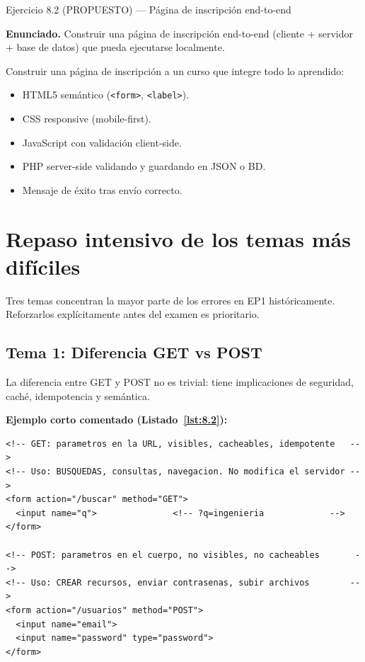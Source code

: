 \documentclass[11pt,a4paper,openany]{book}
\begin{document}
\begin{cajaejercicio}{Ejercicio 8.2 (PROPUESTO) --- Página de inscripción end-to-end}


\textbf{Enunciado.} Construir una página de inscripción end-to-end (cliente + servidor + base de datos) que pueda ejecutarse localmente.

Construir una página de inscripción a un curso que integre todo lo
aprendido:
\begin{itemize}
\item HTML5 semántico (\texttt{<form>}, \texttt{<label>}).
\item CSS responsive (mobile-first).
\item JavaScript con validación client-side.
\item PHP server-side validando y guardando en JSON o BD.
\item Mensaje de éxito tras envío correcto.
\end{itemize}
\end{cajaejercicio}

\section{Repaso intensivo de los temas más difíciles}

Tres temas concentran la mayor parte de los errores en EP1
históricamente. Reforzarlos explícitamente antes del examen es
prioritario.


\subsection{Tema 1: Diferencia GET vs POST}

La diferencia entre GET y POST no es trivial: tiene
implicaciones de seguridad, caché, idempotencia y semántica.

\textbf{Ejemplo corto comentado (Listado~\ref{lst:8.2}):}
\begin{lstlisting}[language=HTML5,numbers=none,caption={Ejemplo de HTML},label=lst:8.2]
<!-- GET: parametros en la URL, visibles, cacheables, idempotente   -->
<!-- Uso: BUSQUEDAS, consultas, navegacion. No modifica el servidor -->
<form action="/buscar" method="GET">
  <input name="q">               <!-- ?q=ingenieria             -->
</form>

<!-- POST: parametros en el cuerpo, no visibles, no cacheables       -->
<!-- Uso: CREAR recursos, enviar contrasenas, subir archivos        -->
<form action="/usuarios" method="POST">
  <input name="email">
  <input name="password" type="password">
</form>
\end{lstlisting}
\end{document}
